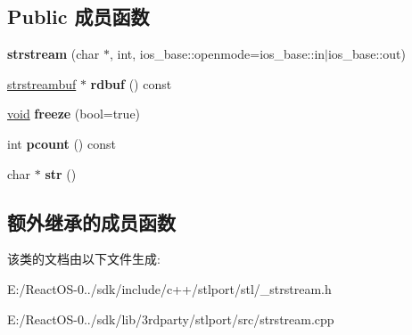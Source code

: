 \subsection*{Public 成员函数}
\begin{DoxyCompactItemize}
\item 
\mbox{\label{classstrstream_a19ce3d53d08a3e0a94407fa146152a73}} 
{\bfseries strstream} (char $\ast$, int, ios\+\_\+base\+::openmode=ios\+\_\+base\+::in$\vert$ios\+\_\+base\+::out)
\item 
\mbox{\label{classstrstream_adfd0d1081d2ba0cdf3a0e6353dfd43c5}} 
\hyperlink{classstrstreambuf}{strstreambuf} $\ast$ {\bfseries rdbuf} () const
\item 
\mbox{\label{classstrstream_af4029c8c3885f9f520d65b537f39ad6c}} 
\hyperlink{interfacevoid}{void} {\bfseries freeze} (bool=true)
\item 
\mbox{\label{classstrstream_a6842fa9a037906f015cf3bf5311671f8}} 
int {\bfseries pcount} () const
\item 
\mbox{\label{classstrstream_a2f2b0368feed08892e6b6a54043ba97a}} 
char $\ast$ {\bfseries str} ()
\end{DoxyCompactItemize}
\subsection*{额外继承的成员函数}


该类的文档由以下文件生成\+:\begin{DoxyCompactItemize}
\item 
E\+:/\+React\+O\+S-\/0../sdk/include/c++/stlport/stl/\+\_\+strstream.\+h\item 
E\+:/\+React\+O\+S-\/0../sdk/lib/3rdparty/stlport/src/strstream.\+cpp\end{DoxyCompactItemize}
